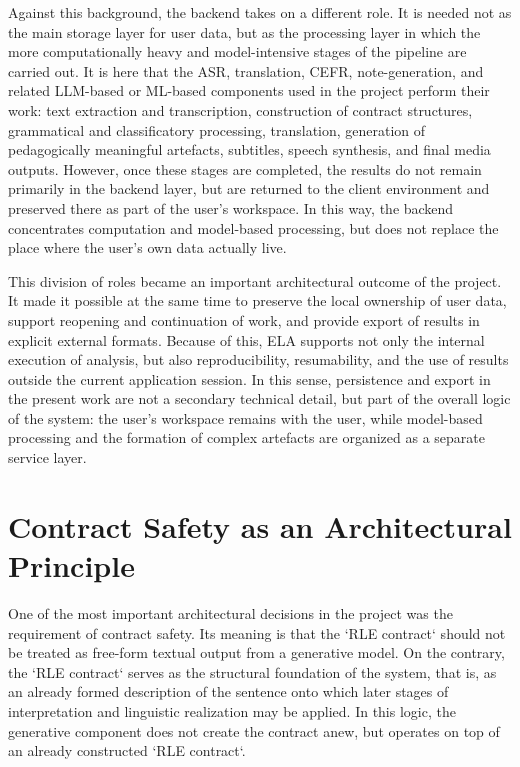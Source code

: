 \documentclass[12pt,a4paper,oneside]{report}
\begin{document}
Against this background, the backend takes on a different role. It is needed not as the main storage layer for user data, but as the processing layer in which the more computationally heavy and model-intensive stages of the pipeline are carried out. It is here that the ASR, translation, CEFR, note-generation, and related LLM-based or ML-based components used in the project perform their work: text extraction and transcription, construction of contract structures, grammatical and classificatory processing, translation, generation of pedagogically meaningful artefacts, subtitles, speech synthesis, and final media outputs. However, once these stages are completed, the results do not remain primarily in the backend layer, but are returned to the client environment and preserved there as part of the user's workspace. In this way, the backend concentrates computation and model-based processing, but does not replace the place where the user's own data actually live.

This division of roles became an important architectural outcome of the project. It made it possible at the same time to preserve the local ownership of user data, support reopening and continuation of work, and provide export of results in explicit external formats. Because of this, ELA supports not only the internal execution of analysis, but also reproducibility, resumability, and the use of results outside the current application session. In this sense, persistence and export in the present work are not a secondary technical detail, but part of the overall logic of the system: the user's workspace remains with the user, while model-based processing and the formation of complex artefacts are organized as a separate service layer.

\section{Contract Safety as an Architectural Principle}
One of the most important architectural decisions in the project was the requirement of contract safety. Its meaning is that the `RLE contract` should not be treated as free-form textual output from a generative model. On the contrary, the `RLE contract` serves as the structural foundation of the system, that is, as an already formed description of the sentence onto which later stages of interpretation and linguistic realization may be applied. In this logic, the generative component does not create the contract anew, but operates on top of an already constructed `RLE contract`.
\end{document}
